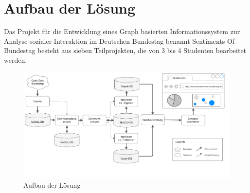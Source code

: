 \section{Aufbau der Lösung}\label{sec:01_02_aufbauLoesung}
Das Projekt für die Entwicklung eines Graph basierten Informationssystem zur Analyse sozialer Interaktion im Deutschen Bundestag benannt \glqq Sentiments Of Bundestag\grqq{} besteht aus sieben Teilprojekten, die von 3 bis 4 Studenten bearbeitet werden. 

\begin{figure}[H]
    \centering
    \includegraphics[width=\textwidth]{images/01-Einleitung/SentimentOfBundestag.png}
    \caption{Aufbau der Lösung}
    \label{fig:aufbauderLösungSOB}
\end{figure}

